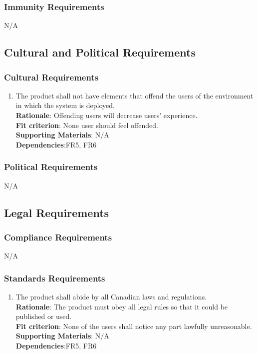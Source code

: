\documentclass{article}
\begin{document}
\subsubsection{Immunity Requirements}
N/A
\subsection{Cultural and Political Requirements}
\subsubsection{Cultural Requirements}
\begin{enumerate}[CP1.1]
    \item The product shall not have elements that offend the users of the environment in which the system is deployed.\\
    \textbf{Rationale}: Offending users will decrease users' experience.\\
    \textbf{Fit criterion}: None user should feel offended.\\
\textbf{Supporting Materials}: N/A\\
\textbf{Dependencies}:FR5, FR6\\

\end{enumerate}
\subsubsection{Political Requirements}
N/A
\subsection{Legal Requirements}
\subsubsection{Compliance Requirements}
N/A
\subsubsection{Standards Requirements}
\begin{enumerate}[LR2.1]
    \item The product shall abide by all Canadian laws and regulations.\\
    \textbf{Rationale}: The product must obey all legal rules so that it could be published or used.\\
    \textbf{Fit criterion}: None of the users shall notice any part lawfully unreasonable.\\
\textbf{Supporting Materials}: N/A\\
\textbf{Dependencies}:FR5, FR6\\
    
  
\end{enumerate}
\end{document}
